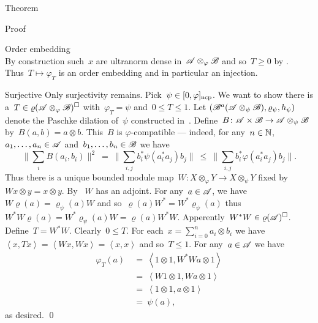 \documentclass[b]{subfiles}
\begin{document}
\begin{parsec}
\begin{point}{Theorem}
\begin{point}{Proof}
\begin{point}{Order embedding}
\begin{equation*}
\end{equation*}
By construction such~$x$ are ultranorm dense in~$\mathscr{A}\otimes_\varphi \mathscr{B}$
    and so~$T \geq 0$ by .
Thus~$T \mapsto \varphi_T$ is an order embedding
    and in particular an injection.
\end{point}
\begin{point}{Surjective}%
Only surjectivity remains.
Pick~$\psi \in [0,\varphi]_{\mathrm{ncp}}$.
We want to show there is a~$T \in \varrho(\mathscr{A} \otimes_\varphi \mathscr{B})^\square$
    with~$\varphi_T = \psi$ and~$0 \leq T \leq 1$.
Let $(\mathscr{B}^a(\mathscr{A} \otimes_\psi \mathscr{B}),
    \varrho_\psi, h_\psi)$ denote the Paschke dilation of~$\psi$
    constructed in~.
Define~$B\colon \mathscr{A} \times \mathscr{B} \to \mathscr{A} \otimes_\psi \mathscr{B}$
    by~$B(a,b) = a \otimes b$.
This~$B$ is $\varphi$-compatible
--- indeed, for any~$n \in \mathbb{N}$, $a_1, \ldots, a_n \in \mathscr{A}$
    and~$b_1, \ldots, b_n \in \mathscr{B}$ we have
\begin{equation*}
    \bigl\| \sum_i B(a_i, b_i) \bigr\|^2
     \ = \  \bigl\| \sum_{i,j}
                b_i^* \psi(a_i^*a_j) b_j \bigr\|
     \ \leq \  \bigl\| \sum_{i,j}
                b_i^* \varphi(a_i^*a_j) b_j \bigr\|.
\end{equation*}
Thus there is a unique bounded module
    map~$W \colon X \otimes_\varphi Y \to X \otimes_\psi Y$
    fixed by~$W x \otimes y = x \otimes y$.
By ~$W$ has an adjoint.
For any~$a\in\mathscr{A}$, we have~$W \varrho(a) = \varrho_\psi(a) W$
and so~$\varrho(a) W^* = W^* \varrho_\psi(a)$
thus~$W^*W \varrho(a) = W^* \varrho_\psi(a) W = \varrho(a) W^*W$.
Apperently~$W^*W \in \varrho(\mathscr{A})^\square$.
Define~$T = W^*W$. Clearly~$0\leq T$.
For each~$x = \sum^n_{i=0} a_i \otimes b_i$
    we have~$\left<x, Tx\right> = \left<Wx,Wx\right> = \left<x,x\right>$
    and so~$T \leq 1$.
For any~$a\in \mathscr{A}$ we have
\begin{align*}
    \varphi_T(a) &\ =\  \left<1\otimes 1, W^*W a \otimes 1\right> \\
    &  \ =\  \left<W 1\otimes 1, W a\otimes1\right> \\
    &  \ = \ \left<1\otimes1, a\otimes1\right> \\
    &  \ = \ \psi(a),
\end{align*}
as desired. \qed
\end{point}
\end{point}
\end{point}
\end{parsec}
\end{document}
